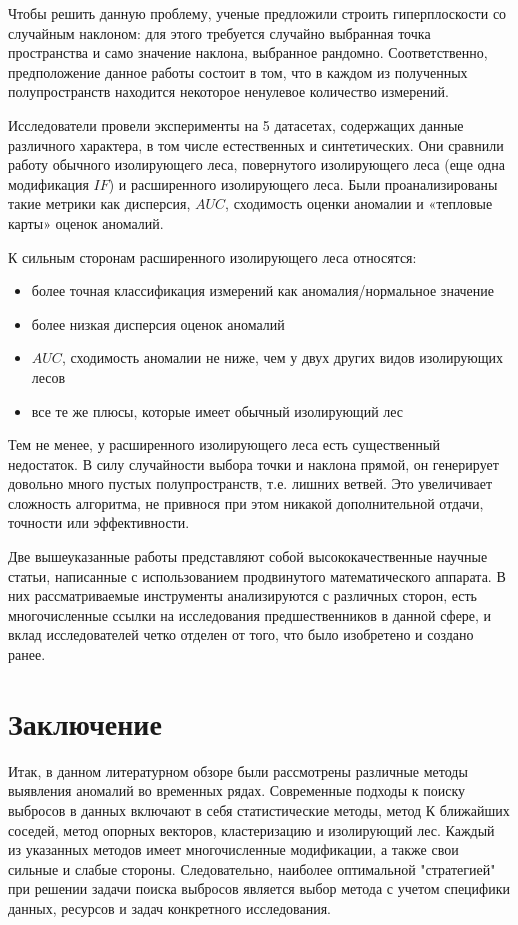 \documentclass[14pt, letterpaper]{extarticle}
\begin{document}
Чтобы решить данную проблему, ученые предложили строить гиперплоскости со случайным наклоном: для этого требуется случайно выбранная точка пространства и само значение наклона, выбранное рандомно. Соответственно, предположение данное работы состоит в том, что в каждом из полученных полупространств находится некоторое ненулевое количество измерений.

Исследователи провели эксперименты на 5 датасетах, содержащих данные различного характера, в том числе естественных и синтетических. Они сравнили работу обычного изолирующего леса, повернутого изолирующего леса (еще одна модификация $IF$) и расширенного изолирующего леса. Были проанализированы такие метрики как дисперсия, $AUC$, сходимость оценки аномалии и «тепловые карты» оценок аномалий. 

К сильным сторонам расширенного изолирующего леса относятся:
\begin{itemize}
    \item более точная классификация измерений как аномалия/нормальное значение
    \item более низкая дисперсия оценок аномалий 
    \item $AUC$, сходимость аномалии не ниже, чем у двух других видов изолирующих лесов
    \item все те же плюсы, которые имеет обычный изолирующий лес
\end{itemize}

Тем не менее, у расширенного изолирующего леса есть существенный недостаток. В силу случайности выбора точки и наклона прямой, он генерирует довольно много пустых полупространств, т.е. лишних ветвей. Это увеличивает сложность алгоритма, не привнося при этом никакой дополнительной отдачи, точности или эффективности.

Две вышеуказанные работы представляют собой высококачественные научные статьи, написанные с использованием продвинутого математического аппарата. В них рассматриваемые инструменты анализируются с различных сторон, есть многочисленные ссылки на исследования предшественников в данной сфере, и вклад исследователей четко отделен от того, что было изобретено и создано ранее.

\newpage
\section{Заключение}

Итак, в данном литературном обзоре были рассмотрены различные методы выявления аномалий во временных рядах. Современные подходы к поиску выбросов в данных включают в себя статистические методы, метод К ближайших соседей, метод опорных векторов, кластеризацию и изолирующий лес. Каждый из указанных методов имеет многочисленные модификации, а также свои сильные и слабые стороны. Следовательно, наиболее оптимальной "стратегией" при решении задачи поиска выбросов является выбор метода с учетом специфики данных, ресурсов и задач конкретного исследования. 
\end{document}
